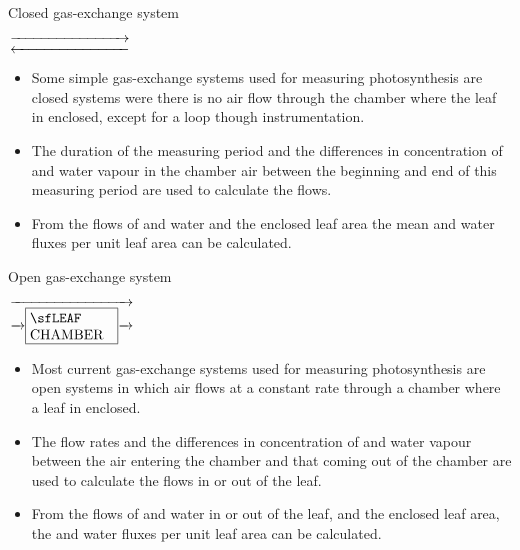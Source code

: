 \documentclass[10pt]{beamer}
\begin{document}
\begin{frame}{Closed gas-exchange system}
    \begin{footnotesize}
        \begin{center}
            $\makebox[3cm]{\rightarrowfill} \atop
            \makebox[3cm]{%
            \leftarrowfill}$
        \end{center}
    \end{footnotesize}
    \begin{itemize}
        \item Some simple gas-exchange systems used for measuring photosynthesis
        are closed systems were there is no air flow through the chamber
        where the leaf in enclosed, except for a loop though instrumentation.

        \item The duration of the measuring period and the differences in concentration
        of \COtwo and water vapour in the chamber air between the beginning and end of
        this measuring period are used to calculate the flows.

        \item From the flows of \COtwo and water and the enclosed leaf area the
        mean \COtwo and water fluxes per unit leaf area can be calculated.
    \end{itemize}
\end{frame}

\begin{frame}{Open gas-exchange system}
\begin{footnotesize}
\begin{center}
%
$\makebox[3.1cm]{\rightarrowfill} \atop
\makebox[3.1cm]{%
\rightarrowfill
\fbox{\parbox{2.1cm}{\sf%
LEAF CHAMBER}}%
\rightarrowfill}$
%
\end{center}
\end{footnotesize}
    \begin{itemize}
        \item Most current gas-exchange systems used for measuring photosynthesis
        are open systems in which air flows at a constant rate through a chamber
        where a leaf in enclosed.

        \item The flow rates and the differences in concentration of \COtwo and
        water vapour between the air entering the chamber and that coming
        out of the chamber are used to calculate the flows in or out of the leaf.

        \item From the flows of \COtwo and water in or out of the leaf, and the enclosed leaf area, the
        \COtwo and water fluxes per unit leaf area can be calculated.
    \end{itemize}
\end{frame}
\end{document}
